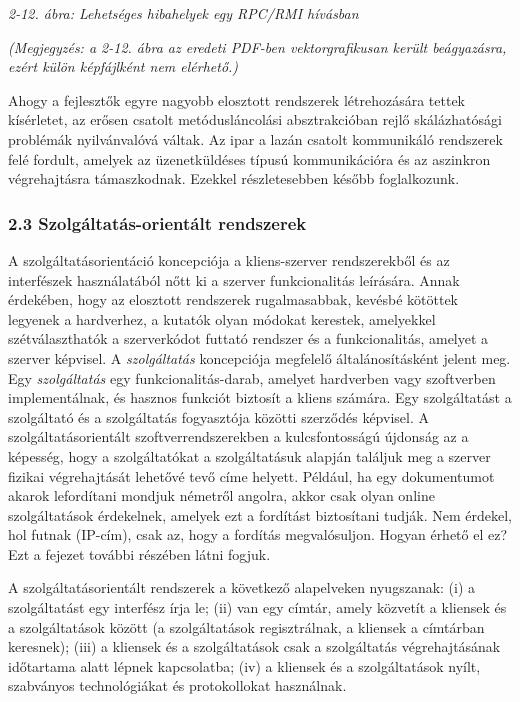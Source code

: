 \documentclass[
]{article}
\begin{document}
\emph{2-12. ábra: Lehetséges hibahelyek egy RPC/RMI hívásban}

\emph{(Megjegyzés: a 2-12. ábra az eredeti PDF-ben vektorgrafikusan
került beágyazásra, ezért külön képfájlként nem elérhető.)}

Ahogy a fejlesztők egyre nagyobb elosztott rendszerek létrehozására
tettek kísérletet, az erősen csatolt metódusláncolási absztrakcióban
rejlő skálázhatósági problémák nyilvánvalóvá váltak. Az ipar a lazán
csatolt kommunikáló rendszerek felé fordult, amelyek az üzenetküldéses
típusú kommunikációra és az aszinkron végrehajtásra támaszkodnak.
Ezekkel részletesebben később foglalkozunk.

\hypertarget{szolguxe1ltatuxe1s-orientuxe1lt-rendszerek}{%
\subsubsection{2.3 Szolgáltatás-orientált
rendszerek}\label{szolguxe1ltatuxe1s-orientuxe1lt-rendszerek}}

A szolgáltatásorientáció koncepciója a kliens-szerver rendszerekből és
az interfészek használatából nőtt ki a szerver funkcionalitás leírására.
Annak érdekében, hogy az elosztott rendszerek rugalmasabbak, kevésbé
kötöttek legyenek a hardverhez, a kutatók olyan módokat kerestek,
amelyekkel szétválaszthatók a szerverkódot futtató rendszer és a
funkcionalitás, amelyet a szerver képvisel. A \emph{szolgáltatás}
koncepciója megfelelő általánosításként jelent meg. Egy
\emph{szolgáltatás} egy funkcionalitás-darab, amelyet hardverben vagy
szoftverben implementálnak, és hasznos funkciót biztosít a kliens
számára. Egy szolgáltatást a szolgáltató és a szolgáltatás fogyasztója
közötti szerződés képvisel. A szolgáltatásorientált
szoftverrendszerekben a kulcsfontosságú újdonság az a képesség, hogy a
szolgáltatókat a szolgáltatásuk alapján találjuk meg a szerver fizikai
végrehajtását lehetővé tevő címe helyett. Például, ha egy dokumentumot
akarok lefordítani mondjuk németről angolra, akkor csak olyan online
szolgáltatások érdekelnek, amelyek ezt a fordítást biztosítani tudják.
Nem érdekel, hol futnak (IP-cím), csak az, hogy a fordítás
megvalósuljon. Hogyan érhető el ez? Ezt a fejezet további részében látni
fogjuk.

A szolgáltatásorientált rendszerek a következő alapelveken nyugszanak:
(i) a szolgáltatást egy interfész írja le; (ii) van egy címtár, amely
közvetít a kliensek és a szolgáltatások között (a szolgáltatások
regisztrálnak, a kliensek a címtárban keresnek); (iii) a kliensek és a
szolgáltatások csak a szolgáltatás végrehajtásának időtartama alatt
lépnek kapcsolatba; (iv) a kliensek és a szolgáltatások nyílt,
szabványos technológiákat és protokollokat használnak.
\end{document}
